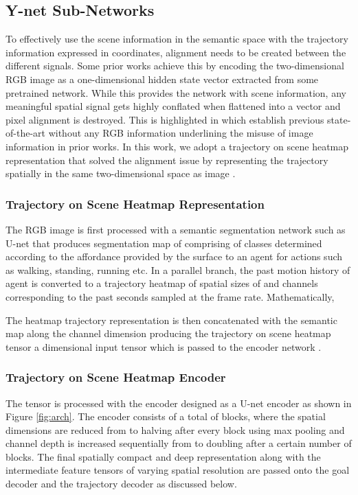 \documentclass[final]{cvpr}
\begin{document}
\subsection{\textsf{Y}-net Sub-Networks}
\label{sec:traj_scene_rep}

To effectively use the scene information in the semantic space with the trajectory information expressed in coordinates, alignment needs to be created between the different signals. Some prior works \cite{sadeghian2019sophie} achieve this by encoding the two-dimensional RGB image  as a one-dimensional hidden state vector extracted from some pretrained network. While this provides the network with scene information, any meaningful spatial signal gets highly conflated when flattened into a vector and pixel alignment is destroyed. This is highlighted in \cite{mangalam2020not} which establish previous state-of-the-art without any RGB information underlining the misuse of image information in prior works. In this work, we adopt a trajectory on scene heatmap representation that solved the alignment issue by representing the trajectory spatially in the same two-dimensional space as image . 

\subsubsection{Trajectory on Scene Heatmap Representation}
\label{sec:traj_on_scene_subsec}
The RGB image  is first processed with a semantic segmentation network such as U-net \cite{unet} that produces segmentation map  of  comprising of  classes determined according to the affordance provided by the surface to an agent for actions such as walking, standing, running etc. In a parallel branch, the past motion history  of agent  is converted to a trajectory heatmap  of spatial sizes of  and  channels corresponding to the past  seconds sampled at the frame rate. Mathematically,   

The heatmap trajectory representation is then concatenated with the semantic map  along the channel dimension producing the trajectory on scene heatmap tensor  a  dimensional input tensor which is passed to the encoder network .  

\subsubsection{Trajectory on Scene Heatmap Encoder}
\label{sec:encoder}
The tensor  is processed with the encoder  designed as a U-net encoder \cite{unet} as shown in Figure \ref{fig:arch}. The encoder  consists of a total of  blocks, where the spatial dimensions are reduced from  to  halving after every block using max pooling and channel depth is increased sequentially from  to  doubling after a certain number of blocks.
The final spatially compact and deep representation  along with the  intermediate feature tensors of varying spatial resolution are passed onto the goal decoder  and the trajectory decoder  as discussed below.
\end{document}
